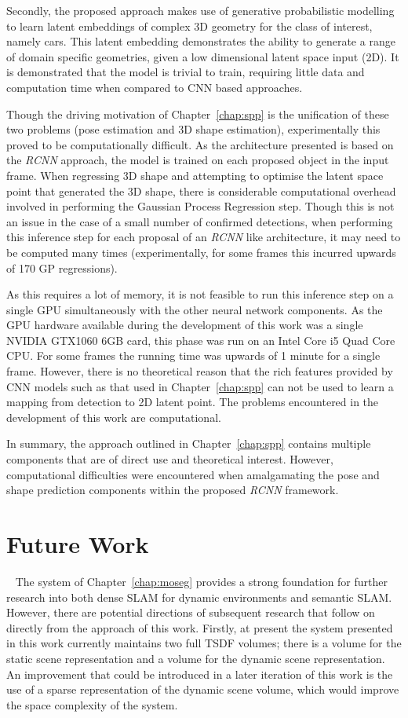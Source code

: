 Secondly, the proposed approach makes use of generative probabilistic modelling to learn latent embeddings of 
complex 3D geometry for the class of interest, namely cars. This latent embedding demonstrates the ability to 
generate a range of domain specific geometries, given a low dimensional latent space input (2D). It is demonstrated 
that the model is trivial to train, requiring little data and computation time when compared to CNN based approaches.

Though the driving motivation of Chapter~\ref{chap:spp} is the unification of these two problems (pose estimation and 
3D shape estimation), experimentally this proved to be computationally difficult. As the architecture presented is 
based on the \textit{RCNN} approach, the model is trained on each proposed object in the input frame. When regressing 
3D shape and attempting to optimise the latent space point that generated the 3D shape, there is considerable 
computational overhead involved in performing the Gaussian Process Regression step. Though this is not an issue in 
the case of a small number of confirmed detections, when performing this inference step for each proposal of an 
\textit{RCNN} like architecture, it may need to be computed many times (experimentally, for some frames this incurred 
upwards of 170 GP regressions). 

As this requires a lot of memory, it is not feasible to run this inference step on a single GPU simultaneously with the 
other neural network components. As the GPU hardware available during the development of this work was a single NVIDIA 
GTX1060 6GB card, this phase was run on an Intel Core i5 Quad Core CPU\@. For some frames the running time was upwards of 
1 minute for a single frame. However, there is no theoretical reason that the rich features provided by CNN models such as 
that used in Chapter~\ref{chap:spp} can not be used to learn a mapping from detection to 2D latent point. The problems 
encountered in the development of this work are computational.

In summary, the approach outlined in Chapter~\ref{chap:spp} contains multiple components that are of direct use and 
theoretical interest. However, computational difficulties were encountered when amalgamating the pose and shape 
prediction components within the proposed \textit{RCNN} framework.

\section{Future Work}
~\label{sec:discussion_limitations}
The system of Chapter~\ref{chap:moseg} provides a strong foundation for further research 
into both dense SLAM for dynamic environments and semantic SLAM\@. However, there are 
potential directions of subsequent research that follow on directly from the approach of 
this work. Firstly, at present the system presented in this work currently maintains two full 
TSDF volumes; there is a volume for the static scene representation and a volume for the dynamic 
scene representation. An improvement that could be introduced in a later iteration of this work 
is the use of a sparse representation of the dynamic scene volume, which would improve the space 
complexity of the system. 

